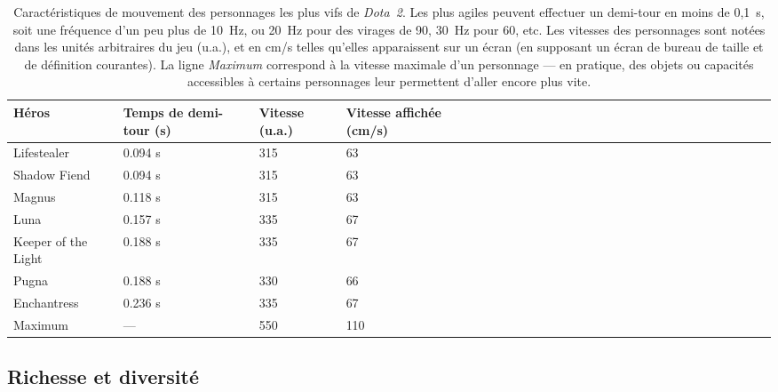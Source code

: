 \begin{appendices}
	
	
	\newcommand{\newrow}{\bigstrut[t] \\ \hline}
	\begin{table}[!htbp]
		\centering
		\begin{tabularx}{\textwidth}{ Y X X X } %
		Héros				&	Temps de demi-tour (s)	&	Vitesse (u.a.)	&	Vitesse affichée (cm/s)	\newrow
		Lifestealer			&	0.094 s					&	315				&	63						\newrow
		Shadow Fiend		&	0.094 s					&	315				&	63						\newrow
		Magnus				&	0.118 s					&	315				&	63						\newrow
		Luna				&	0.157 s					&	335				&	67						\newrow
		Keeper of the Light	&	0.188 s					&	335				&	67						\newrow
		Pugna				&	0.188 s					&	330				&	66						\newrow
		Enchantress			&	0.236 s					&	335				&	67						\newrow
		\og Maximum \fg{}	&	---						&	550				&	110						\newrow
		\end{tabularx}
		\caption[Caractéristiques de mouvement des personnages vifs de \emph{Dota~2}]{Caractéristiques de mouvement des personnages les plus vifs de \emph{Dota~2}. Les plus \og agiles \fg{} peuvent effectuer un demi-tour en moins de 0,1~s, soit une fréquence d'un peu plus de 10~Hz, ou 20~Hz pour des virages de 90\textdegree, 30~Hz pour 60\textdegree, etc. Les vitesses des personnages sont notées dans les unités arbitraires du jeu (u.a.), et en cm/s telles qu'elles apparaissent sur un écran (en supposant un écran de bureau de taille et de définition courantes). La ligne \emph{Maximum} correspond à la vitesse \og maximale \fg{} d'un personnage --- en pratique, des objets ou capacités accessibles à certains personnages leur permettent d'aller encore plus vite.}
		\label{tab:dotamoves}
	\end{table}
	
	
	
	
	


	\subsection{Richesse et diversité}
	

\end{appendices}
